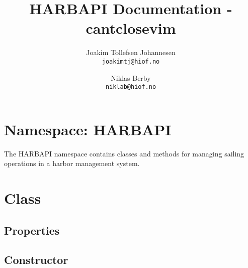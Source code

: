 \documentclass[12pt]{article}
\title{HARBAPI Documentation - cantclosevim}
\author{
    Joakim Tollefsen Johannesen\\
    \texttt{joakimtj@hiof.no}
    \and
    Niklas Berby\\
    \texttt{niklab@hiof.no}
}
\begin{document}
\maketitle

\section{Namespace: HARBAPI}

The HARBAPI namespace contains classes and methods for managing sailing operations in a harbor management system.

\section*{Class}

\subsection*{Properties}

\subsection*{Constructor}
\end{document}
